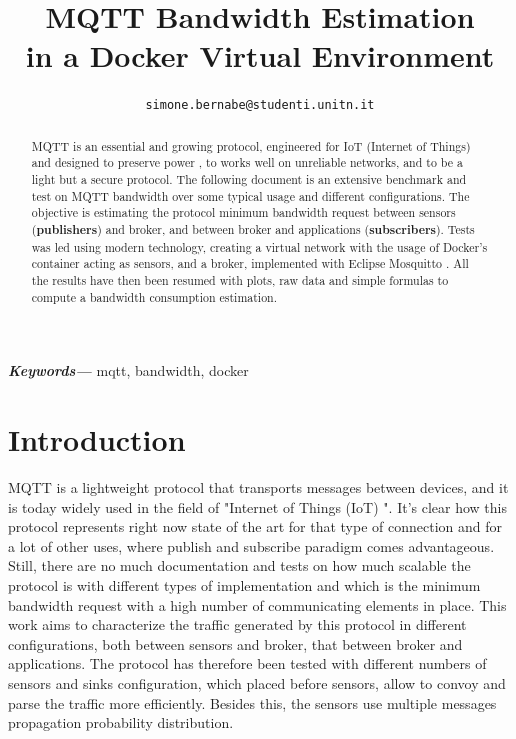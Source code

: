 \documentclass[journal]{IEEEtran}
\providecommand{\keywords}[1]
{
	\small	
	\textbf{\textit{Keywords---}} #1
}
\begin{document}
\title{MQTT Bandwidth Estimation\\ in a Docker Virtual Environment}

\author{
	\texttt{simone.bernabe@studenti.unitn.it}
}

\makeatletter
\def\endthebibliography{%
	\def\@noitemerr{\@latex@warning{Empty `thebibliography' environment}}%
	\endlist
}
\makeatother


\maketitle

\begin{abstract}
MQTT is an essential and growing protocol, engineered for IoT (Internet of Things) and designed to preserve power \cite{lowp}, to works well on unreliable networks, and to be a light but a secure protocol. The following document is an extensive benchmark and test on MQTT bandwidth over some typical usage and different configurations. The objective is estimating the protocol minimum bandwidth request between sensors (\textbf{publishers}) and broker, and between broker and applications (\textbf{subscribers}). Tests was led using modern technology, creating a virtual network with the usage of Docker's container acting as sensors, and a broker, implemented with Eclipse Mosquitto \cite{mosquitto}. All the results have then been resumed with plots, raw data and simple formulas to compute a bandwidth consumption estimation.
\end{abstract}
\hspace{10pt}

\keywords{mqtt, bandwidth, docker}

\acresetall

\section{Introduction}
\label{sec:introduction}
MQTT is a lightweight protocol that transports messages between devices, and it is today widely used in the field of "Internet of Things (IoT) \cite{mqtt}". 
It's clear how this protocol represents right now state of the art for that type of connection and for a lot of other uses, where publish and subscribe paradigm comes advantageous. Still, there are no much documentation and tests on how much scalable the protocol is with different types of implementation and which is the minimum bandwidth request with a high number of communicating elements in place. This work aims to characterize the traffic generated by this protocol in different configurations, both between sensors and broker, that between broker and applications. The protocol has therefore been tested with different numbers of sensors and sinks configuration, which placed before sensors, allow to convoy and parse the traffic more efficiently. Besides this, the sensors use multiple messages propagation probability distribution. 
\end{document}
